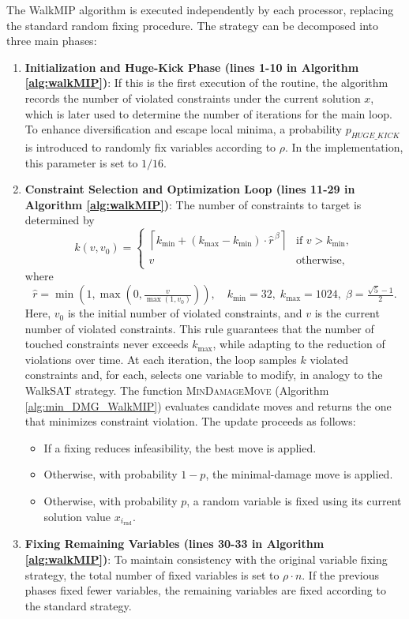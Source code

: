 The WalkMIP algorithm is executed independently by each processor, replacing the standard random fixing procedure. The strategy can be decomposed into three main phases:

\begin{enumerate}
    \item \textbf{Initialization and Huge-Kick Phase (lines 1-10 in Algorithm \ref{alg:walkMIP})}: If this is the first execution of the routine, the algorithm records the number of violated constraints under the current solution $x$, which is later used to determine the number of iterations for the main loop. To enhance diversification and escape local minima, a probability $p_{HUGE\_KICK}$ is introduced to randomly fix variables according to $\rho$. In the implementation, this parameter is set to $1/16$.
    
    \item \textbf{Constraint Selection and Optimization Loop (lines 11-29 in Algorithm \ref{alg:walkMIP})}: 
    The number of constraints to target is determined by
    \[
    k(v, v_0) =
    \begin{cases}
    \left\lceil k_{\min} + (k_{\max}-k_{\min}) \cdot \hat{r}^{\,\beta} \right\rceil & \text{if } v > k_{\min}, \\[0.5em]
    v & \text{otherwise},
    \end{cases}
    \]
    where
    \[
    \hat{r} = \min\!\left(1, \max\!\left(0, \tfrac{v}{\max(1, v_0)}\right)\right), 
    \quad k_{\min} = 32,\; k_{\max} = 1024,\; \beta = \tfrac{\sqrt{5}-1}{2}.
    \]
    Here, $v_0$ is the initial number of violated constraints, and $v$ is the current number of violated constraints.
    This rule guarantees that the number of touched constraints never exceeds $k_{\max}$, while adapting to the reduction of violations over time. 
    At each iteration, the loop samples $k$ violated constraints and, for each, selects one variable to modify, in analogy to the WalkSAT strategy. 
    The function \textsc{MinDamageMove} (Algorithm \ref{alg:min_DMG_WalkMIP}) evaluates candidate moves and returns the one that minimizes constraint violation. The update proceeds as follows:
    \begin{itemize}
        \item If a fixing reduces infeasibility, the best move is applied.
        \item Otherwise, with probability $1-p$, the minimal-damage move is applied.
        \item Otherwise, with probability $p$, a random variable is fixed using its current solution value $x_{i_{\mathrm{rnd}}}$.
    \end{itemize}

    
    \item \textbf{Fixing Remaining Variables (lines 30-33 in Algorithm \ref{alg:walkMIP})}: To maintain consistency with the original variable fixing strategy, the total number of fixed variables is set to $\rho \cdot n$. If the previous phases fixed fewer variables, the remaining variables are fixed according to the standard strategy.
\end{enumerate}

